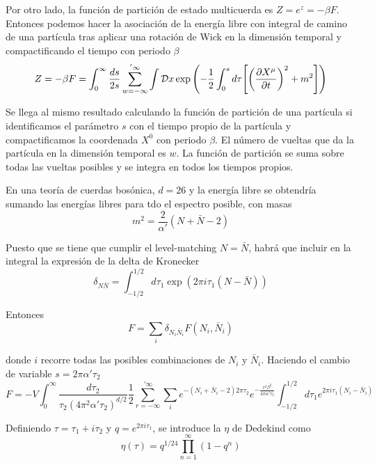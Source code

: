 Por otro lado, la función de partición de estado multicuerda es $Z=e^z=-\beta F$. 
Entonces podemos hacer la asociación de la energía libre con integral de camino de 
una partícula tras aplicar una rotación de Wick en la dimensión temporal y compactificando el
tiempo con periodo $\beta$
\begin{equation}
  Z=-\beta F= \int_0^\infty \frac{ds}{2s}\sum^{'\infty}_{w=-\infty} \int \mathcal{D}x 
  \exp\qty(-\frac 1 2 \int_0^s d\tau \qty[\qty(\pdv{X^\mu}{t})^2+m^2])
\end{equation}

Se llega al mismo resultado calculando la función de partición de una partícula  si identificamos 
el parámetro $s$ con el tiempo propio  de la partícula y compactificamos 
la coordenada $X^0$ con periodo $\beta$. El número de vueltas que da la
partícula en la dimensión temporal es $w$. La función de partición se suma sobre
todas las vueltas posibles y se integra en todos los tiempos propios.

En una teoría de cuerdas bosónica, $d=26$ y la energía libre se obtendría sumando las
energías libres para tdo el espectro posible, con masas
\begin{equation}
  m^2=\frac{2}{\alpha'}(N+\bar N-2)
\end{equation}

Puesto que se tiene que cumplir el level-matching $N=\bar N$, habrá que incluir en la 
integral la expresión de la delta de Kronecker
\begin{equation}
   \delta_{N\bar N}=\int_{-1/2}^{1/2}d\tau_1 \exp(2\pi i\tau_1 (N-\bar N))
\end{equation}

Entonces
\begin{equation}
  F=\sum_i \delta_{N_i \bar N_i} F(N_i,\bar N_i)
\end{equation}

donde $i$ recorre todas las posibles combinaciones de $N_i$ y $\bar N_i$.
Haciendo el cambio de variable $s=2\pi\alpha'\tau_2$
\begin{equation}
  F=-V \int_0^\infty \frac{d\tau_2}{\tau_2(4\pi^2\alpha'\tau_2)^{d/2}}\frac 1 2\sum_{r=-\infty}^{'\infty} 
  \sum_i e^{-(N_i+\bar N_i -2)2\pi\tau_2} e^{-\frac{r^2\beta^2}{4\pi\alpha'\tau_2}}\int_{-1/2}^{1/2} d\tau_1 e^{2\pi i\tau_1(N_i-\bar N_i)}
\end{equation}

Definiendo $\tau=\tau_1+i\tau_2$ y $q=e^{2\pi i\tau_1}$, se introduce la $\eta$ de 
Dedekind como
\begin{equation}
  \eta(\tau)=q^{1/24}\prod_{n=1}^{\infty} (1-q^n)
\end{equation}

